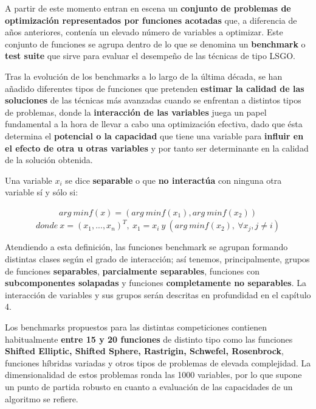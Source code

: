 A partir de este momento entran en escena un \textbf{conjunto de problemas de optimización representados por funciones acotadas} que, a diferencia de años anteriores, contenía un elevado número de variables a optimizar. Este conjunto de funciones se agrupa dentro de lo que se denomina un \textbf{benchmark} o \textbf{test suite} que sirve para evaluar el desempeño de las técnicas de tipo LSGO.

Tras la evolución de los benchmarks a lo largo de la última década, se han añadido diferentes tipos de funciones que pretenden \textbf{estimar la calidad de las soluciones} de las técnicas más avanzadas cuando se enfrentan a distintos tipos de problemas, donde la \textbf{interacción de las variables} juega un papel fundamental a la hora de llevar a cabo una optimización efectiva, dado que ésta determina el \textbf{potencial o la capacidad} que tiene una variable para  \textbf{influir en el efecto de otra u otras variables} y por tanto ser determinante en la calidad de la solución obtenida.

Una variable $x_i$ se dice \textbf{separable} o que \textbf{no interactúa} con ninguna otra variable sí y sólo si:

\begin{equation}\label{eq:separable}
	\begin{gathered}
		arg \ minf(x) = (arg \ min f(x_1), arg \ min f(x_2))
	\end{gathered}
\end{equation}
$$
donde \ x = (x_1,...,x_n)^T,  \ x_1 = x_i \ y \ (arg \ min f(x_2), \ \forall x_j, j\neq i)
$$

Atendiendo a esta definición\cite{ELSGOI}, las funciones benchmark se agrupan formando distintas clases según el grado de interacción; así tenemos, principalmente, grupos de funciones \textbf{separables}, \textbf{parcialmente separables}, funciones con \textbf{subcomponentes solapadas} y funciones \textbf{completamente no separables}. La interacción de variables y sus grupos serán descritas en profundidad en el capítulo 4.

Los benchmarks propuestos para las distintas competiciones contienen habitualmente \textbf{entre 15 y 20 funciones} de distinto tipo como las funciones \textbf{Shifted Elliptic, Shifted Sphere, Rastrigin, Schwefel, Rosenbrock}, funciones híbridas variadas y otros tipos de problemas de elevada complejidad\cite{ComprehensiveComparison}. La dimensionalidad de estos problemas ronda las 1000 variables, por lo que supone un punto de partida robusto en cuanto a evaluación de las capacidades  de un algoritmo se refiere.

